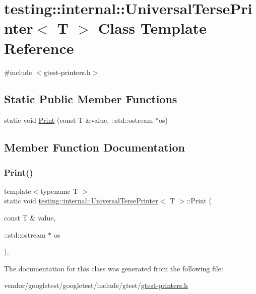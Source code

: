 \hypertarget{classtesting_1_1internal_1_1_universal_terse_printer}{}\section{testing\+:\+:internal\+:\+:Universal\+Terse\+Printer$<$ T $>$ Class Template Reference}
\label{classtesting_1_1internal_1_1_universal_terse_printer}


{\ttfamily \#include $<$gtest-\/printers.\+h$>$}

\subsection*{Static Public Member Functions}
\begin{DoxyCompactItemize}
\item 
static void \hyperlink{classtesting_1_1internal_1_1_universal_terse_printer_a042249cdb42fdb77588c9ad54ea7ed54}{Print} (const T \&value, \+::std\+::ostream $\ast$os)
\end{DoxyCompactItemize}


\subsection{Member Function Documentation}
\mbox{\label{classtesting_1_1internal_1_1_universal_terse_printer_a042249cdb42fdb77588c9ad54ea7ed54}} 
\subsubsection{\texorpdfstring{Print()}{Print()}}
{\footnotesize\ttfamily template$<$typename T $>$ \\
static void \hyperlink{classtesting_1_1internal_1_1_universal_terse_printer}{testing\+::internal\+::\+Universal\+Terse\+Printer}$<$ T $>$\+::Print (\begin{DoxyParamCaption}\item[{const T \&}]{value,  }\item[{\+::std\+::ostream $\ast$}]{os }\end{DoxyParamCaption})\hspace{0.3cm}{\ttfamily [inline]}, {\ttfamily [static]}}



The documentation for this class was generated from the following file\+:\begin{DoxyCompactItemize}
\item 
vendor/googletest/googletest/include/gtest/\hyperlink{gtest-printers_8h}{gtest-\/printers.\+h}\end{DoxyCompactItemize}
